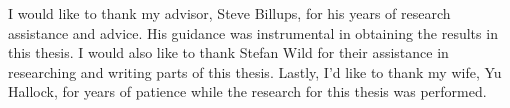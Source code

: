 I would like to thank my advisor, Steve Billups, for his years of research assistance and advice. 
His guidance was instrumental in obtaining the results in this thesis. 
I would also like to thank Stefan Wild for their assistance in researching and writing parts of this thesis. 
Lastly, I'd like to thank my wife, Yu Hallock, for years of patience while the research for this thesis was performed.  
